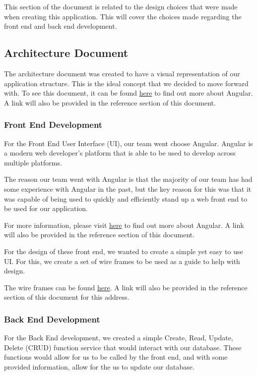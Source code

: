 \documentclass{article}
\begin{document}
	This section of the document is related to the design choices that were made when creating this application. This will cover the choices made regarding the front end and back end development. 
	
	\subsection{Architecture Document}
	
	The architecture document was created to have a visual representation of our application structure. This is the ideal concept that we decided to move forward with. To see this document, it can be found \href{https://tinyurl.com/ymk2ef47}{here} to find out more about Angular. A link will also be provided in the reference section of this document.
	
	\subsubsection{Front End Development}
	
	For the Front End User Interface (UI), our team went choose Angular. Angular is a modern web developer's platform that is able to be used to develop across multiple platforms. 
	
	The reason our team went with Angular is that the majority of our team has had some experience with Angular in the past, but the key reason for this was that it was capable of being used to quickly and efficiently stand up a web front end to be used for our application.
	
	For more information, please visit  \href{https://tinyurl.com/95a47v97}{here} to find out more about Angular. A link will also be provided in the reference section of this document.
	
	For the design of these front end, we wanted to create a simple yet easy to use UI. For this, we create a set of wire frames to be used as a guide to help with design.
	
	The wire frames can be found \href{https://tinyurl.com/2p9de34c}{here}. A link will also be provided in the reference section of this document for this address.
	
	\subsubsection{Back End Development}
	
	For the Back End development, we created a simple Create, Read, Update, Delete (CRUD) function service that would interact with our database. These functions would allow for us to be called by the front end, and with some provided information, allow for the us to update our database.
	
\end{document}
